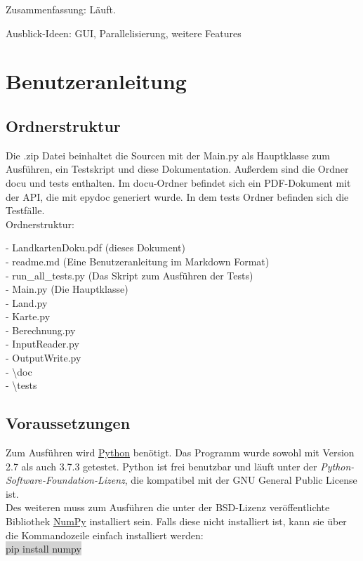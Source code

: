\documentclass[a4paper,11pt]{article}
\newcommand*{\mybox}[2]{\colorbox{#1!30}{\parbox{.98\linewidth}{#2}}}
\begin{document}
{Zusammenfassung: Läuft.

Ausblick-Ideen: GUI, Parallelisierung, weitere Features


\section{Benutzeranleitung}
\subsection{Ordnerstruktur}
Die .zip Datei beinhaltet die Sourcen mit der Main.py als Hauptklasse zum Ausf\"uhren, ein Testskript und diese Dokumentation. Außerdem sind die Ordner \glqq docu\grqq{} und \glqq tests\grqq{} enthalten.
Im \glqq docu\grqq{}-Ordner befindet sich ein PDF-Dokument mit der API, die mit epydoc generiert wurde. In dem tests Ordner befinden sich die Testf\"alle.\\
\vspace{2mm}
Ordnerstruktur:\\
\mybox{background}{
	- LandkartenDoku.pdf (dieses Dokument)\\
	- readme.md (Eine Benutzeranleitung im Markdown Format)\\
	- run\_all\_tests.py (Das Skript zum Ausf\"uhren der Tests)\\
	- Main.py (Die Hauptklasse)\\
	- Land.py\\
	- Karte.py\\
	- Berechnung.py\\
	- InputReader.py\\
	- OutputWrite.py\\
	- \textbackslash doc\\
	- \textbackslash tests
}
\subsection{Voraussetzungen}
Zum Ausf\"uhren wird \href{https://www.python.org/}{Python} ben\"otigt. Das Programm wurde sowohl mit Version 2.7 als auch 3.7.3 getestet. Python ist frei benutzbar und l\"auft unter der
\textit{Python-Software-Foundation-Lizenz}, die kompatibel mit der GNU General Public License ist.\\
Des weiteren muss zum Ausf\"uhren die unter der BSD-Lizenz ver\"offentlichte Bibliothek \href{https://www.numpy.org/}{NumPy} installiert sein.
Falls diese nicht installiert ist, kann sie \"uber die Kommandozeile einfach installiert werden:\\
\colorbox{lightgray}{pip install numpy}\\

}
\end{document}
